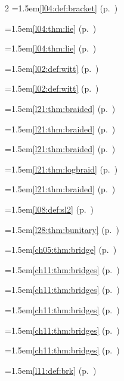 \begin{multicols}{2}
\hangindent=1.5em\quad \ref{l04:def:bracket} (p.~\pageref{l04:def:bracket})\par
\hangindent=1.5em\quad \ref{l04:thm:lie} (p.~\pageref{l04:thm:lie})\par
\hangindent=1.5em\quad \ref{l04:thm:lie} (p.~\pageref{l04:thm:lie})\par
\hangindent=1.5em\quad \ref{l02:def:witt} (p.~\pageref{l02:def:witt})\par
\hangindent=1.5em\quad \ref{l02:def:witt} (p.~\pageref{l02:def:witt})\par
\hangindent=1.5em\quad \ref{l21:thm:braided} (p.~\pageref{l21:thm:braided})\par
\hangindent=1.5em\quad \ref{l21:thm:braided} (p.~\pageref{l21:thm:braided})\par
\hangindent=1.5em\quad \ref{l21:thm:braided} (p.~\pageref{l21:thm:braided})\par
\hangindent=1.5em\quad \ref{l21:thm:logbraid} (p.~\pageref{l21:thm:logbraid})\par
\hangindent=1.5em\quad \ref{l21:thm:braided} (p.~\pageref{l21:thm:braided})\par
\hangindent=1.5em\quad \ref{l08:def:sl2} (p.~\pageref{l08:def:sl2})\par
\hangindent=1.5em\quad \ref{l28:thm:bunitary} (p.~\pageref{l28:thm:bunitary})\par
\hangindent=1.5em\quad \ref{ch05:thm:bridge} (p.~\pageref{ch05:thm:bridge})\par
\hangindent=1.5em\quad \ref{ch11:thm:bridges} (p.~\pageref{ch11:thm:bridges})\par
\hangindent=1.5em\quad \ref{ch11:thm:bridges} (p.~\pageref{ch11:thm:bridges})\par
\hangindent=1.5em\quad \ref{ch11:thm:bridges} (p.~\pageref{ch11:thm:bridges})\par
\hangindent=1.5em\quad \ref{ch11:thm:bridges} (p.~\pageref{ch11:thm:bridges})\par
\hangindent=1.5em\quad \ref{ch11:thm:bridges} (p.~\pageref{ch11:thm:bridges})\par
\hangindent=1.5em\quad \ref{l11:def:brk} (p.~\pageref{l11:def:brk})\par

\end{multicols}
